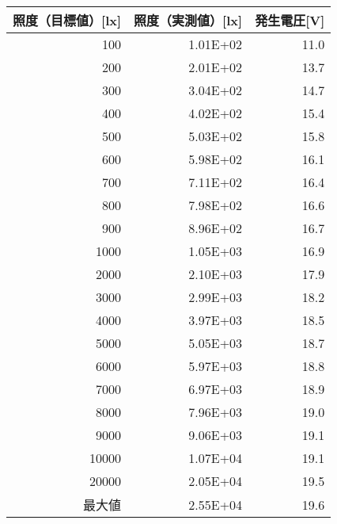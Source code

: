 \begin{tabular}{@{}rrr@{}}
  \toprule
  \multicolumn{1}{c}{照度（目標値）{[}lx{]}} & \multicolumn{1}{c}{照度（実測値）{[}lx{]}} & \multicolumn{1}{c}{発生電圧{[}V{]}} \\ \midrule
  100    & 1.01E+02 & 11.0\\
  200   & 2.01E+02 & 13.7\\
  300   & 3.04E+02 & 14.7\\
  400   & 4.02E+02 & 15.4\\
  500   & 5.03E+02 & 15.8\\
  600   & 5.98E+02 & 16.1\\
  700   & 7.11E+02 & 16.4\\
  800   & 7.98E+02 & 16.6\\
  900   & 8.96E+02 & 16.7\\
  1000  & 1.05E+03 & 16.9\\
  2000  & 2.10E+03 & 17.9\\
  3000  & 2.99E+03 & 18.2\\
  4000  & 3.97E+03 & 18.5\\
  5000  & 5.05E+03 & 18.7\\
  6000  & 5.97E+03 & 18.8\\
  7000  & 6.97E+03 & 18.9\\
  8000  & 7.96E+03 & 19.0\\
  9000  & 9.06E+03 & 19.1\\
  10000 & 1.07E+04 & 19.1\\
  20000 & 2.05E+04 & 19.5\\
  最大値 & 2.55E+04 & 19.6\\ \bottomrule
\end{tabular}